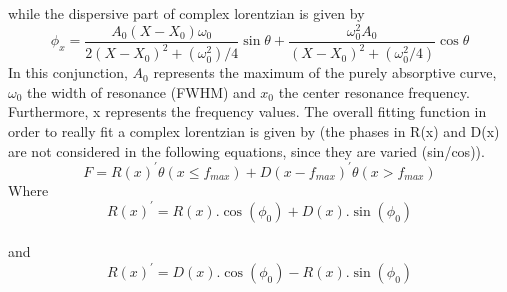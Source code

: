 while the dispersive part of complex lorentzian is given by 
\begin{equation}
\phi_x= \frac{A_0 (X-X_0 )\omega_0}{2(X-X_0 )^2+(\omega_0^2)/4}\sin\theta+\frac{\omega_0^2A_0}{(X-X_0 )^2+(\omega_0^2/4)}\cos\theta
\end{equation}
In this conjunction, $A_0$ represents the maximum of the purely absorptive curve, $\omega_0$ the width
of resonance (FWHM) and $x_0$ the center resonance frequency. Furthermore, x represents
the frequency values.
The overall fitting function in order to really fit a complex lorentzian is given by (the
phases in R(x) and D(x) are not considered in the following equations, since they are varied
(sin/cos)).\\


\begin{equation}
F = R(x)^{'}\theta(x \leq f_{max}) + D(x-f_{max})^{'}\theta(x > f_{max})
\end{equation}
Where 
\begin{equation}
R(x)^{'}=R(x) . \cos(\phi_0) + D(x) .\sin(\phi_0)
\end{equation}\\
and
\begin{equation}
R(x)^{'}=D(x) . \cos(\phi_0) - R(x) .\sin(\phi_0)
\end{equation}

